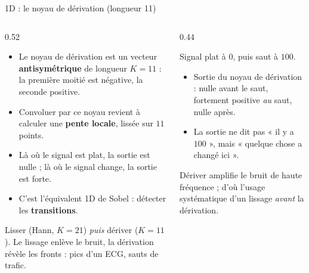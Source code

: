 \begin{frame}{1D : le noyau de dérivation (longueur 11)}
\begin{columns}[t]
\begin{column}{0.52\textwidth}
\begin{itemize}
  \item Le noyau de dérivation est un vecteur \textbf{antisymétrique} de
  longueur $K = 11$ : la première moitié est négative, la seconde positive.
  \item Convoluer par ce noyau revient à calculer une \textbf{pente locale},
  lissée sur $11$ points.
  \item Là où le signal est plat, la sortie est nulle ; là où le signal
  change, la sortie est forte.
  \item C'est l'équivalent 1D de Sobel : détecter les \textbf{transitions}.
\end{itemize}
\begin{kbox}
Lisser (Hann, $K = 21$) \emph{puis} dériver ($K = 11$). Le lissage enlève
le bruit, la dérivation révèle les fronts : pics d'un ECG, sauts de trafic.
\end{kbox}
\end{column}
\begin{column}{0.44\textwidth}
\begin{ebox}
Signal plat à $0$, puis saut à $100$.
\begin{itemize}
  \item Sortie du noyau de dérivation : nulle avant le saut, fortement
  positive \emph{au} saut, nulle après.
  \item La sortie ne dit pas « il y a $100$ », mais « quelque chose a changé
  ici ».
\end{itemize}
\end{ebox}
\begin{wbox}
Dériver amplifie le bruit de haute fréquence ; d'où l'usage systématique
d'un lissage \emph{avant} la dérivation.
\end{wbox}
\end{column}
\end{columns}
\end{frame}

